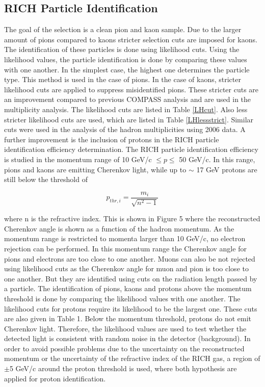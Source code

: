 \subsection{RICH Particle Identification}

The goal of the selection is a clean pion and kaon sample. Due to the larger amount of pions compared to kaons stricter selection cuts are imposed for kaons. The
identification of these particles is done using likelihood cuts. Using the likelihood values, the particle identification is done by comparing these values with one
another. In the simplest case, the highest one determines the particle type. This method is used in the case of pions. In the case of kaons, stricter likelihood cuts
are applied to suppress misidentified pions. These stricter cuts are an improvement compared to previous COMPASS analysis and are used in the multiplicity analysis.
The likelihood cuts are listed in Table \ref{LHcut}. Also less stricter likelihood cuts are used, which are listed in Table \ref{LHlessstrict}. Similar cuts were used in the analysis of the hadron
multiplicities using 2006 data. A further improvement is the inclusion of protons in the RICH particle identification efficiency determination.
The RICH particle identification efficiency is studied in the momentum range of 10 GeV/c $ \leq p \leq $ 50 GeV/c. In this range, pions and kaons are emitting Cherenkov
light, while up to $\sim$ 17 GeV protons are still below the threshold of

\begin{equation}
  p_{thr,i} = \frac{m_i}{ \sqrt{n^{2}-1} }
\end{equation}

where n is the refractive index. This is shown in Figure 5 where the reconstructed Cherenkov angle is shown as a function of the hadron momentum. As the momentum range
is restricted to momenta larger than 10 GeV/c, no electron rejection can be performed. In this momentum range the Cherenkov angle for pions and electrons are too close
to one another. Muons can also be not rejected using likelihood cuts as the Cherenkov angle for muon and pion is too close to one another. But they are identified using
cuts on the radiation length passed by a particle. The identification of pions, kaons and protons above the momentum threshold is done by comparing the likelihood values
with one another. The likelihood cuts for protons require its likelihood to be the largest one. These cuts are also given in Table 1. Below the momentum threshold, protons
do not emit Cherenkov light. Therefore, the likelihood values are used to test whether the detected light is consistent with random noise in the detector (background).
In order to avoid possible problems due to the uncertainty on the reconstructed momentum or the uncertainty of the refractive index of the RICH gas, a region of $\pm$5 GeV/c
around the proton threshold is used, where both hypothesis are applied for proton identification.

